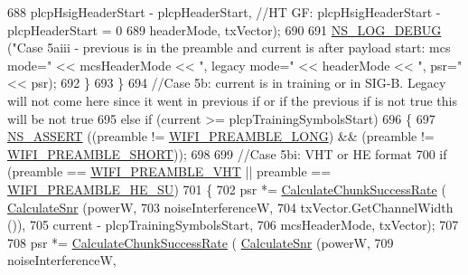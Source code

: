 \begin{DoxyCode}
688                                                     plcpHsigHeaderStart - plcpHeaderStart, \textcolor{comment}{//HT GF:
       plcpHsigHeaderStart - plcpHeaderStart = 0}
689                                                     headerMode, txVector);
690 
691                   \hyperlink{group__logging_ga413f1886406d49f59a6a0a89b77b4d0a}{NS\_LOG\_DEBUG} (\textcolor{stringliteral}{"Case 5aiii - previous is in the preamble and current is after
       payload start: mcs mode="} << mcsHeaderMode << \textcolor{stringliteral}{", legacy mode="} << headerMode << \textcolor{stringliteral}{", psr="} << psr);
692                 \}
693             \}
694           \textcolor{comment}{//Case 5b: current is in training or in SIG-B. Legacy will not come here since it went in
       previous if or if the previous if is not true this will be not true}
695           \textcolor{keywordflow}{else} \textcolor{keywordflow}{if} (current >= plcpTrainingSymbolsStart)
696             \{
697               \hyperlink{assert_8h_a6dccdb0de9b252f60088ce281c49d052}{NS\_ASSERT} ((preamble != \hyperlink{group__wifi_gga5e94a56cb338a14ffbbb19c6a41251eba12f3d9468d1630bd38bbef20df1e3eda}{WIFI\_PREAMBLE\_LONG}) && (preamble != 
      \hyperlink{group__wifi_gga5e94a56cb338a14ffbbb19c6a41251ebab9a39ca1f62d36c33ac489c4cf59745b}{WIFI\_PREAMBLE\_SHORT}));
698 
699               \textcolor{comment}{//Case 5bi: VHT or HE format}
700               \textcolor{keywordflow}{if} (preamble == \hyperlink{group__wifi_gga5e94a56cb338a14ffbbb19c6a41251ebab90b0fe0b17f27e51c0fe16239e7b089}{WIFI\_PREAMBLE\_VHT} || preamble == 
      \hyperlink{group__wifi_gga5e94a56cb338a14ffbbb19c6a41251eba99c3e12c6e91fc9a9bee491d20dab807}{WIFI\_PREAMBLE\_HE\_SU})
701                 \{
702                   psr *= \hyperlink{classns3_1_1InterferenceHelper_ab1c34c3f7ecef1e37ec778c0cf0e9cef}{CalculateChunkSuccessRate} (
      \hyperlink{classns3_1_1InterferenceHelper_a8f6192d041874595004c007c5a519b4b}{CalculateSnr} (powerW,
703                                                                   noiseInterferenceW,
704                                                                   txVector.GetChannelWidth ()),
705                                                     current - plcpTrainingSymbolsStart,
706                                                     mcsHeaderMode, txVector);
707 
708                   psr *= \hyperlink{classns3_1_1InterferenceHelper_ab1c34c3f7ecef1e37ec778c0cf0e9cef}{CalculateChunkSuccessRate} (
      \hyperlink{classns3_1_1InterferenceHelper_a8f6192d041874595004c007c5a519b4b}{CalculateSnr} (powerW,
709                                                                   noiseInterferenceW,

\end{DoxyCode}
